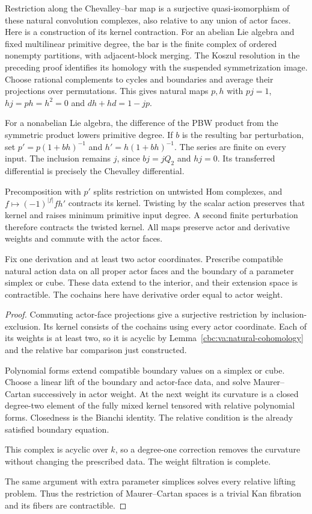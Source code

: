 Restriction along the Chevalley--bar map
is a surjective quasi-isomorphism of these
natural convolution complexes, also relative
to any union of actor faces.
Here is a construction of its kernel contraction.
For an abelian Lie algebra and fixed
multilinear primitive degree, the bar is
the finite complex of ordered nonempty
partitions, with adjacent-block merging.
The Koszul resolution in the preceding proof
identifies its homology with the suspended
symmetrization image. Choose rational
complements to cycles and boundaries and
average their projections over permutations.
This gives natural maps $p,h$ with
$pj=1$, $hj=ph=h^2=0$ and $dh+hd=1-jp$.

For a nonabelian Lie algebra, the difference
of the PBW product from the symmetric product
lowers primitive degree. If $b$ is the
resulting bar perturbation, set
$p'=p(1+bh)^{-1}$ and $h'=h(1+bh)^{-1}$.
The series are finite on every input.
The inclusion remains $j$, since $bj=jQ_2$
and $hj=0$. Its transferred differential
is precisely the Chevalley differential.

Precomposition with $p'$ splits restriction
on untwisted Hom complexes, and
$f\mapsto(-1)^{|f|}fh'$ contracts its kernel.
Twisting by the scalar action preserves
that kernel and raises minimum primitive
input degree. A second finite perturbation
therefore contracts the twisted kernel.
All maps preserve actor and derivative
weights and commute with the actor faces.

\begin{lemma}\label{cbc:va:coherent-fillings}
Fix one derivation and at least two actor coordinates.
Prescribe compatible natural action data on all proper
actor faces and the boundary of a parameter simplex or cube.
These data extend to the interior, and their extension
space is contractible.
The cochains here have derivative order
equal to actor weight.
\end{lemma}
\begin{proof}
Commuting actor-face projections give a
surjective restriction by inclusion-exclusion.
Its kernel consists of the cochains using
every actor coordinate.
Each of its weights is at least two,
so it is acyclic by
Lemma~\ref{cbc:va:natural-cohomology} and the
relative bar comparison just constructed.

Polynomial forms extend compatible boundary
values on a simplex or cube. Choose a
linear lift of the boundary and actor-face
data, and solve Maurer--Cartan successively
in actor weight. At the next weight its
curvature is a closed degree-two element
of the fully mixed kernel tensored with
relative polynomial forms. Closedness is
the Bianchi identity. The relative condition
is the already satisfied boundary equation.

This complex is acyclic over $k$, so a
degree-one correction removes the curvature
without changing the prescribed data.
The weight filtration is complete.

The same argument with extra parameter
simplices solves every relative lifting
problem. Thus the restriction of
Maurer--Cartan spaces is a trivial Kan
fibration and its fibers are contractible.
\end{proof}

